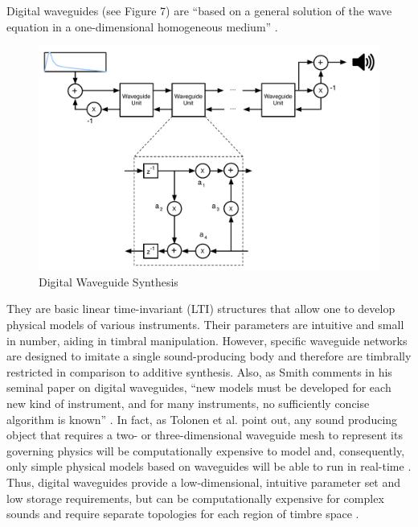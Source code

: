 \documentclass[12pt]{report} 	%
\numberwithin{figure}{chapter}
\numberwithin{table}{chapter}
\numberwithin{equation}{chapter}
\begin{document}
\begin{flushleft}
Digital waveguides (see Figure 7) are ``based on a general solution of the wave equation in a one-dimensional homogeneous medium'' \cite[p. 63]{Tolonen:1998bh}. 
\begin{figure}[h!]
\begin{center}
\includegraphics[scale=0.55]{DigitalWaveguideSynthesis}
\caption[Digital waveguide synthesis]{Digital Waveguide Synthesis}
\end{center}
\end{figure}
They are basic linear time-invariant (LTI) structures that allow one to develop physical models of various instruments. Their parameters are intuitive and small in number, aiding in timbral manipulation. However, specific waveguide networks are designed to imitate a single sound-producing body and therefore are timbrally restricted in comparison to additive synthesis. Also, as Smith comments in his seminal paper on digital waveguides, ``new models must be developed for each new kind of instrument, and for many instruments, no sufficiently concise algorithm is known'' \cite[p. 86]{III:1992zn}. In fact, as Tolonen et al. point out, any sound producing object that requires a two- or three-dimensional waveguide mesh to represent its governing physics will be computationally expensive to model and, consequently, only simple physical models based on waveguides will be able to run in real-time \cite[p. 99-100]{Tolonen:1998bh}. Thus, digital waveguides provide a low-dimensional, intuitive parameter set and low storage requirements, but can be computationally expensive for complex sounds and require separate topologies for each region of timbre space \cite[p. 50]{Nicol:2005rp}.


\end{flushleft}
\end{document}
